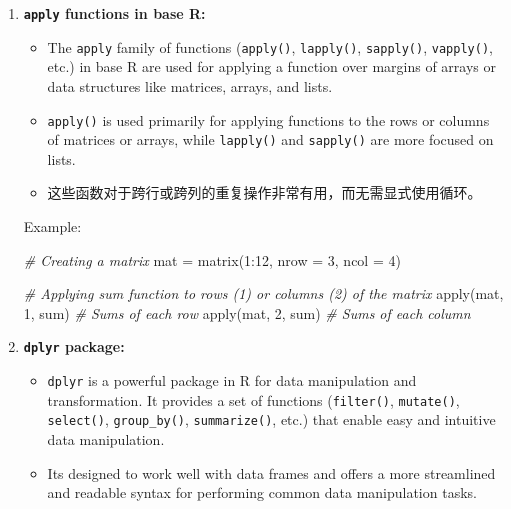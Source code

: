 \documentclass[
]{article}
\newenvironment{Shaded}{}{}
\newcommand{\AttributeTok}[1]{\textcolor[rgb]{0.49,0.56,0.16}{#1}}
\newcommand{\CommentTok}[1]{\textcolor[rgb]{0.38,0.63,0.69}{\textit{#1}}}
\newcommand{\DecValTok}[1]{\textcolor[rgb]{0.25,0.63,0.44}{#1}}
\newcommand{\FunctionTok}[1]{\textcolor[rgb]{0.02,0.16,0.49}{#1}}
\newcommand{\NormalTok}[1]{#1}
\newcommand{\OtherTok}[1]{\textcolor[rgb]{0.00,0.44,0.13}{#1}}
\newcommand{\SpecialCharTok}[1]{\textcolor[rgb]{0.25,0.44,0.63}{#1}}
\begin{document}
\begin{enumerate}
\def\labelenumi{\arabic{enumi}.}
\item
  \textbf{\texttt{apply} functions in base R:}

  \begin{itemize}
  \item
    The \texttt{apply} family of functions (\texttt{apply()},
    \texttt{lapply()}, \texttt{sapply()}, \texttt{vapply()}, etc.) in
    base R are used for applying a function over margins of arrays or
    data structures like matrices, arrays, and lists.
  \item
    \texttt{apply()} is used primarily for applying functions to the
    rows or columns of matrices or arrays, while \texttt{lapply()} and
    \texttt{sapply()} are more focused on lists.
  \item
    这些函数对于跨行或跨列的重复操作非常有用，而无需显式使用循环。
  \end{itemize}

  Example:

\begin{Shaded}
\begin{Highlighting}[]
 \CommentTok{\# Creating a matrix}
\NormalTok{ mat }\OtherTok{=} \FunctionTok{matrix}\NormalTok{(}\DecValTok{1}\SpecialCharTok{:}\DecValTok{12}\NormalTok{, }\AttributeTok{nrow =} \DecValTok{3}\NormalTok{, }\AttributeTok{ncol =} \DecValTok{4}\NormalTok{)}

 \CommentTok{\# Applying sum function to rows (1) or columns (2) of the matrix}
 \FunctionTok{apply}\NormalTok{(mat, }\DecValTok{1}\NormalTok{, sum)  }\CommentTok{\# Sums of each row}
 \FunctionTok{apply}\NormalTok{(mat, }\DecValTok{2}\NormalTok{, sum)  }\CommentTok{\# Sums of each column}
\end{Highlighting}
\end{Shaded}
\item
  \textbf{\texttt{dplyr} package:}

  \begin{itemize}
  \item
    \texttt{dplyr} is a powerful package in R for data manipulation and
    transformation. It provides a set of functions (\texttt{filter()},
    \texttt{mutate()}, \texttt{select()}, \texttt{group\_by()},
    \texttt{summarize()}, etc.) that enable easy and intuitive data
    manipulation.
  \item
    It\textquotesingle s designed to work well with data frames and
    offers a more streamlined and readable syntax for performing common
    data manipulation tasks.
  \end{itemize}


\end{enumerate}
\end{document}
